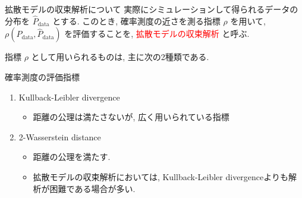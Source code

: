 \documentclass[11pt]{beamer}
\newcommand{\Pdata}{P_{\text{data}}}
\newcommand{\Phatdata}{\hat{P}_{\text{data}}}
\begin{document}
\begin{frame}{拡散モデルの収束解析について}
      実際にシミュレーションして得られるデータの分布を $\Phatdata$ とする.
      このとき, 確率測度の近さを測る指標 $\rho$ を用いて, $\rho(\Pdata,\Phatdata)$ を評価することを,
    \textcolor{red}{拡散モデルの収束解析} と呼ぶ.


    指標 $\rho$ として用いられるものは, 主に次の2種類である.
    \begin{block}{確率測度の評価指標}
      {\large
        \begin{enumerate}
          \item Kullback-Leibler divergence
          \begin{itemize}
            \item 距離の公理は満たさないが, 広く用いられている指標
          \end{itemize}
          \item 2-Wasserstein distance
          \begin{itemize}
            \item 距離の公理を満たす.
            \item 拡散モデルの収束解析においては, Kullback-Leibler divergenceよりも解析が困難である場合が多い.
          \end{itemize}
        \end{enumerate}
      }
    \end{block}

\end{frame}
\end{document}
